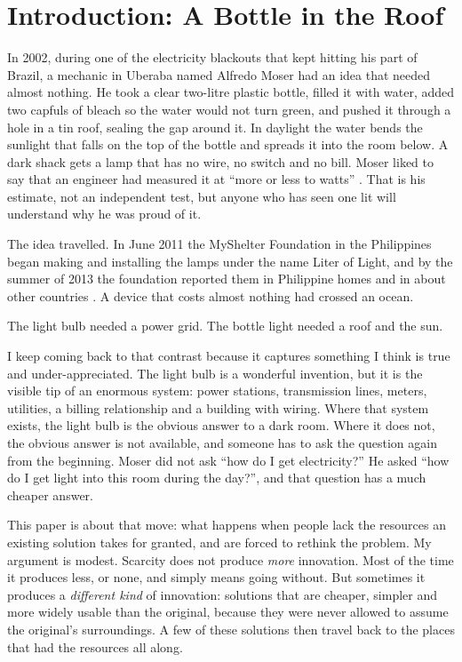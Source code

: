 \section{Introduction: A Bottle in the Roof}
\label{sec:introduction}

In 2002, during one of the electricity blackouts that kept hitting his part of
Brazil, a mechanic in Uberaba named Alfredo Moser had an idea that needed
almost nothing. He took a clear two-litre plastic bottle, filled it with water,
added two capfuls of bleach so the water would not turn green, and pushed it
through a hole in a tin roof, sealing the gap around it. In daylight the water
bends the sunlight that falls on the top of the bottle and spreads it into the
room below. A dark shack gets a lamp that has no wire, no switch and no bill.
Moser liked to say that an engineer had measured it at ``more or less
\mooserWattsLow{} to \mooserWattsHigh{} watts''
\parencite{zobel2013bbc}. That is his estimate, not an independent test, but
anyone who has seen one lit will understand why he was proud of it.

The idea travelled. In June 2011 the MyShelter Foundation in the Philippines
began making and installing the lamps under the name Liter of Light, and by
the summer of 2013 the foundation reported them in \literHomesPhilippines{}
Philippine homes and in about \literCountries{} other countries
\parencite{zobel2013bbc}. A device that costs almost nothing had crossed an
ocean.

\begin{pullquote}
The light bulb needed a power grid. The bottle light needed a roof and the sun.
\end{pullquote}

I keep coming back to that contrast because it captures something I think is
true and under-appreciated. The light bulb is a wonderful invention, but it is
the visible tip of an enormous system: power stations, transmission lines,
meters, utilities, a billing relationship and a building with wiring. Where
that system exists, the light bulb is the obvious answer to a dark room. Where
it does not, the obvious answer is not available, and someone has to ask the
question again from the beginning. Moser did not ask ``how do I get
electricity?'' He asked ``how do I get light into this room during the day?'',
and that question has a much cheaper answer.

This paper is about that move: what happens when people lack the resources an
existing solution takes for granted, and are forced to rethink the problem.
My argument is modest. Scarcity does not produce \emph{more} innovation.
Most of the time it produces less, or none, and simply means going without.
But sometimes it produces a \emph{different kind} of innovation: solutions
that are cheaper, simpler and more widely usable than the original, because
they were never allowed to assume the original's surroundings. A few of these
solutions then travel back to the places that had the resources all along.


